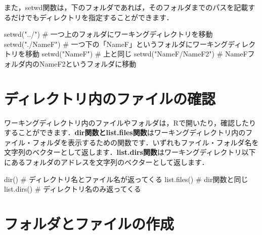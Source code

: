 \documentclass[
  letterpaper,
  DIV=11,
  numbers=noendperiod]{scrreprt}
\newenvironment{Shaded}{\begin{snugshade}}{\end{snugshade}}
\newcommand{\CommentTok}[1]{\textcolor[rgb]{0.37,0.37,0.37}{#1}}
\newcommand{\FunctionTok}[1]{\textcolor[rgb]{0.28,0.35,0.67}{#1}}
\newcommand{\NormalTok}[1]{\textcolor[rgb]{0.00,0.23,0.31}{#1}}
\newcommand{\StringTok}[1]{\textcolor[rgb]{0.13,0.47,0.30}{#1}}
\begin{document}
また，setwd関数は，下のフォルダであれば，そのフォルダまでのパスを記載するだけでもディレクトリを指定することができます．

\begin{Shaded}
\begin{Highlighting}[]
\FunctionTok{setwd}\NormalTok{(}\StringTok{"../"}\NormalTok{) }\CommentTok{\# 一つ上のフォルダにワーキングディレクトリを移動}
\FunctionTok{setwd}\NormalTok{(}\StringTok{"./NameF"}\NormalTok{) }\CommentTok{\# 一つ下の「NameF」というフォルダにワーキングディレクトリを移動}
\FunctionTok{setwd}\NormalTok{(}\StringTok{"NameF"}\NormalTok{) }\CommentTok{\# 上と同じ}
\FunctionTok{setwd}\NormalTok{(}\StringTok{"NameF/NameF2"}\NormalTok{) }\CommentTok{\# NameFフォルダ内のNameF2というフォルダに移動}
\end{Highlighting}
\end{Shaded}

\hypertarget{ux30c7ux30a3ux30ecux30afux30c8ux30eaux5185ux306eux30d5ux30a1ux30a4ux30ebux306eux78baux8a8d}{%
\section{ディレクトリ内のファイルの確認}\label{ux30c7ux30a3ux30ecux30afux30c8ux30eaux5185ux306eux30d5ux30a1ux30a4ux30ebux306eux78baux8a8d}}

ワーキングディレクトリ内のファイルやフォルダは，Rで開いたり，確認したりすることができます．\textbf{dir関数とlist.files関数}はワーキングディレクトリ内のファイル・フォルダを表示するための関数です．いずれもファイル・フォルダ名を文字列のベクターとして返します．\textbf{list.dirs関数}はワーキングディレクトリ以下にあるフォルダのアドレスを文字列のベクターとして返します．

\begin{Shaded}
\begin{Highlighting}[]
\FunctionTok{dir}\NormalTok{() }\CommentTok{\# ディレクトリ名とファイル名が返ってくる}
\FunctionTok{list.files}\NormalTok{() }\CommentTok{\# dir関数と同じ}
\FunctionTok{list.dirs}\NormalTok{() }\CommentTok{\# ディレクトリ名のみ返ってくる}
\end{Highlighting}
\end{Shaded}

\hypertarget{ux30d5ux30a9ux30ebux30c0ux3068ux30d5ux30a1ux30a4ux30ebux306eux4f5cux6210}{%
\section{フォルダとファイルの作成}\label{ux30d5ux30a9ux30ebux30c0ux3068ux30d5ux30a1ux30a4ux30ebux306eux4f5cux6210}}
\end{document}
